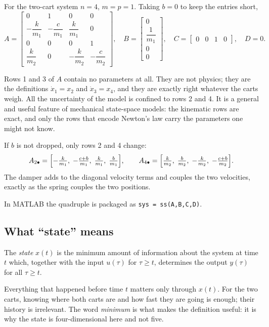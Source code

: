 \documentclass[11pt]{article}
\begin{document}
For the two-cart system $n=4$, $m=p=1$. Taking $b=0$ to keep the entries short,
\begin{equation}\label{eq:ABCD}
 A=\begin{bmatrix}
     0 & 1 & 0 & 0\\[2pt]
     -\dfrac{k}{m_1} & -\dfrac{c}{m_1} & \dfrac{k}{m_1} & 0\\[6pt]
     0 & 0 & 0 & 1\\[2pt]
     \dfrac{k}{m_2} & 0 & -\dfrac{k}{m_2} & -\dfrac{c}{m_2}
   \end{bmatrix},\quad
 B=\begin{bmatrix}0\\[2pt] \dfrac{1}{m_1}\\[6pt] 0\\[2pt] 0\end{bmatrix},\quad
 C=\begin{bmatrix}0&0&1&0\end{bmatrix},\quad D = 0 .
\end{equation}

\begin{remark}
Rows 1 and 3 of $A$ contain no parameters at all. They are not physics; they are
the definitions $\dot x_1=x_2$ and $\dot x_3=x_4$, and they are exactly right
whatever the carts weigh. All the uncertainty of the model is confined to rows 2
and 4. It is a general and useful feature of mechanical state-space models: the
kinematic rows are exact, and only the rows that encode Newton's law carry the
parameters one might not know.
\end{remark}

\begin{remark}
If $b$ is not dropped, only rows 2 and 4 change:
\[
   A_{2\bullet}=\Bigl[-\tfrac{k}{m_1},\;-\tfrac{c+b}{m_1},\;\tfrac{k}{m_1},\;\tfrac{b}{m_1}\Bigr],
   \qquad
   A_{4\bullet}=\Bigl[\tfrac{k}{m_2},\;\tfrac{b}{m_2},\;-\tfrac{k}{m_2},\;-\tfrac{c+b}{m_2}\Bigr].
\]
The damper adds to the diagonal velocity terms and couples the two velocities,
exactly as the spring couples the two positions.
\end{remark}

In MATLAB the quadruple is packaged as \verb|sys = ss(A,B,C,D)|.

\subsection{What ``state'' means}
\begin{definition}[state]\label{def:state}
The \emph{state} $x(t)$ is the minimum amount of information about the system at
time $t$ which, together with the input $u(\tau)$ for $\tau\ge t$, determines the
output $y(\tau)$ for all $\tau\ge t$.
\end{definition}
Everything that happened before time $t$ matters only through $x(t)$. For the two
carts, knowing where both carts are and how fast they are going is enough; their
history is irrelevant. The word \emph{minimum} is what makes the definition
useful: it is why the state is four-dimensional here and not five.
\end{document}
